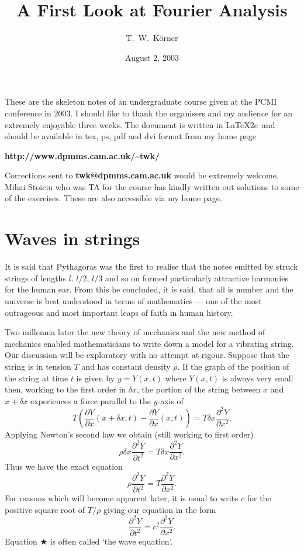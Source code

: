 \documentclass[12pt]{article}
\theoremstyle{definition}
\begin{document}
\title{A First Look at Fourier Analysis}
\author{T.~W.~K\"{o}rner}
\date{August 2, 2003}

\maketitle
\begin{footnotesize}
These are the skeleton notes of an undergraduate course
given at the PCMI conference in 2003. I should like to thank
the organisers and my audience for an extremely enjoyable
three weeks.
The document is written in 
\LaTeX2e\ and should be available in tex, ps, pdf and dvi format
from my home page
\begin{center}
{\bf http://www.dpmms.cam.ac.uk/\~{}twk/}
\end{center}
Corrections sent to {\bf twk@dpmms.cam.ac.uk} would be extremely welcome.
Mihai Stoiciu who was TA for the course has kindly written out 
solutions to some of the exercises. 
These are also accessible via my home page.
\end{footnotesize}

\newpage
\tableofcontents

\newpage

\section{Waves in strings} 

It is said that Pythagoras
was the first to realise that the notes emitted by
struck strings of lengths $l$. $l/2$, $l/3$ and so on
formed particularly attractive harmonies for the human ear.
From this he concluded, it is said, that all is number
and the universe is best understood in terms of mathematics
--- one of the most outrageous and
most important leaps of faith in human history.

Two millennia later the new theory of mechanics
and the new method of mechanics enabled mathematicians
to write down a model for a vibrating string.
Our discussion will be exploratory with no
attempt at rigour.
Suppose that the string is in tension $T$ and
has constant density $\rho$. If the graph of
the position of the string at time $t$ is given
by $y=Y(x,t)$ where $Y(x,t)$ is always very
small then, working to the first order in $\delta x$, 
the portion of the string between $x$ and $x+\delta x$
experiences a force parallel to the $y$-axis of
\[T\left(\frac{\partial Y}{\partial x}(x+\delta x,t)
-\frac{\partial Y}{\partial x}(x,t)\right)
=T\delta x\frac{\partial^{2} Y}{\partial x^{2}}.\]
Applying Newton's second law we obtain
(still working to first order)
\[\rho\delta x\frac{\partial^{2} Y}{\partial t^{2}}
=T\delta x\frac{\partial^{2} Y}{\partial x^{2}}.\]
Thus we have the exact equation
\[\rho\frac{\partial^{2} Y}{\partial t^{2}}
=T\frac{\partial^{2} Y}{\partial x^{2}}.\]
For reasons which will become apparent later,
it is usual to write $c$ for the positive square root of
$T/\rho$ giving our equation in the form
\begin{equation*}\tag*{$\bigstar$}
\frac{\partial^{2} Y}{\partial t^{2}}
=c^{2}\frac{\partial^{2} Y}{\partial x^{2}}.
\end{equation*}
Equation $\bigstar$ is often called `the wave equation'.
\end{document}
